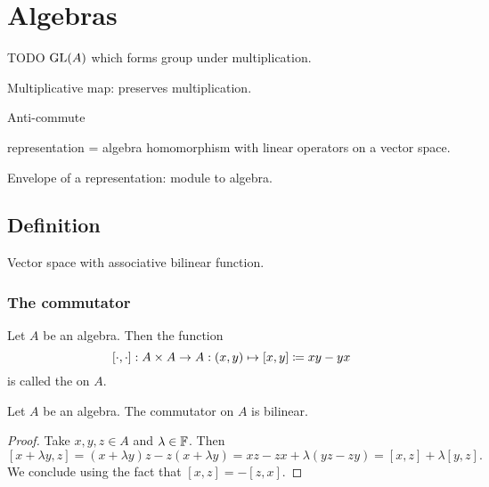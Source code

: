 \chapter{Algebras}
TODO $\operatorname{GL}(A)$ which forms group under multiplication.

Multiplicative map: preserves multiplication.

Anti-commute

representation = algebra homomorphism with linear operators on a vector space.

Envelope of a representation: module to algebra.

\section{Definition}
\begin{definition}
Vector space with associative bilinear function.
\end{definition}

\subsection{The commutator}
\begin{definition}
Let $A$ be an algebra. Then the function
\[ [\cdot, \cdot]: A\times A \to A: (x,y) \mapsto [x,y] \coloneqq xy - yx \]
is called the  on $A$.
\end{definition}

\begin{lemma} \label{commutatorBilinear}
Let $A$ be an algebra. The commutator on $A$ is bilinear.
\end{lemma}
\begin{proof}
Take $x,y,z\in A$ and $\lambda \in \mathbb{F}$. Then
\[ [x+\lambda y, z] = (x+\lambda y)z - z(x+\lambda y) = xz - zx + \lambda(yz - zy) = [x,z] + \lambda[y,z]. \]
We conclude using the fact that $[x,z] = -[z,x]$.
\end{proof}

